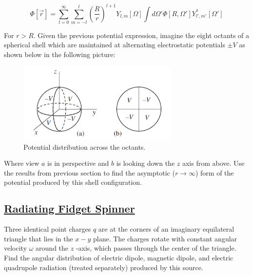 \begin{equation}
	\Phi[\vec{r}] = \sum_{l=0}^{\infty} \sum_{m=-l}^{l} \left(\frac{R}{r}\right)^{l+1} Y_{l,m} [\Omega]\int d \Omega ' \Phi [R, \Omega '] Y^{*}_{l',m'}[\Omega ']
\end{equation}

For $r > R$. Given the previous potential expression, imagine the eight octants of a spherical shell which are maintained at alternating electrostatic potentials  $\pm V$ as shown below in the following picture:

\begin{figure}[htbp!]
	\includegraphics[width=8cm]{figures/shells.png}
	\centering
	\caption{Potential distribution across the octants.}
\end{figure}

Where view $a$ is in perspective and $b$ is looking down the $z$ axis from above. Use the results from previous section to find the asymptotic ($r \rightarrow \infty$) form of the potential produced by this shell configuration.

\subsection{\hyperref[Radiating Fidget Spinner]{Radiating Fidget Spinner}}

Three identical point charges $q$ are at the corners of an imaginary equilateral triangle that lies in the $x-y$ plane. The charges rotate with constant angular velocity $\omega$ around the $z$ -axis, which passes through the center of the triangle. Find the angular distribution of electric dipole, magnetic dipole, and electric quadrupole radiation (treated separately) produced by this source.

